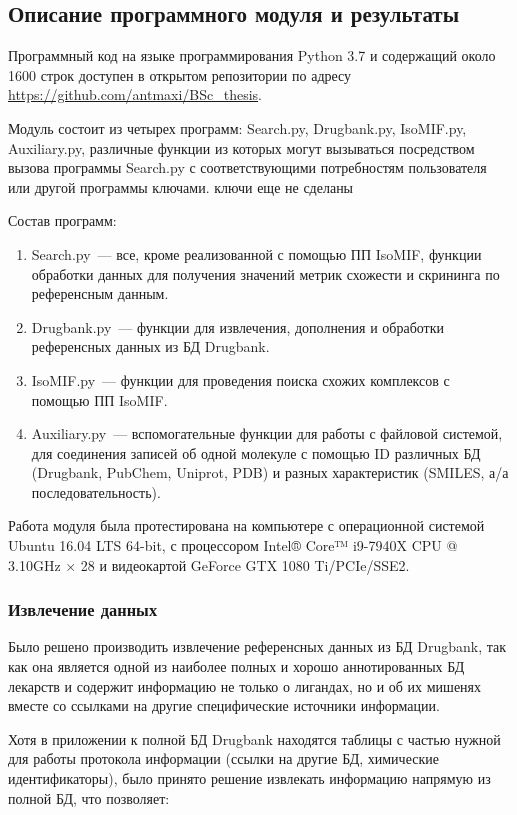 \documentclass[a4paper,14pt]{article}         %
\newcommand{\sic}[1]{\LARGE\color{orange}{#1}\color{black}\Large}
\begin{document}
\subsection{Описание программного модуля и результаты}
Программный код на языке программирования Python 3.7 \cite{python37} и содержащий около 1600 строк \sic{обновлять} доступен в открытом репозитории по адресу \href{https://github.com/antmaxi/BSc\_thesis}{https://github.com/antmaxi/BSc\_thesis}.

Модуль состоит из четырех программ: Search.py, Drugbank.py, IsoMIF.py, Auxiliary.py, различные функции из которых могут вызываться посредством вызова программы Search.py с соответствующими потребностям пользователя или другой программы ключами. \color{orange} ключи еще не сделаны \color{black}

Состав программ:
\begin{enumerate}
	\item Search.py~--- все, кроме реализованной с помощью ПП IsoMIF, функции обработки данных для получения значений метрик схожести и скрининга по референсным данным.
	\item Drugbank.py~--- функции для извлечения, дополнения и обработки референсных данных из БД Drugbank.
	\item IsoMIF.py~--- функции для проведения поиска схожих комплексов с помощью ПП IsoMIF.
	\item Auxiliary.py~--- вспомогательные функции для работы с файловой системой, для соединения записей об одной молекуле с помощью ID различных БД (Drugbank, PubChem, Uniprot, PDB) и разных характеристик (SMILES, а/а последовательность).
\end{enumerate}

Работа модуля была протестирована на компьютере с операционной системой Ubuntu 16.04 LTS 64-bit, с процессором Intel® Core™ i9-7940X CPU @ 3.10GHz $\times$ 28 и видеокартой GeForce GTX 1080 Ti/PCIe/SSE2.
\subsubsection{Извлечение данных}
Было решено производить извлечение референсных данных из БД Drugbank, так как она является одной из наиболее полных и хорошо аннотированных БД лекарств \cite{Wishart2017} и содержит информацию не только о лигандах, но и об их мишенях вместе со ссылками на другие специфические источники информации. 

Хотя в приложении к полной БД Drugbank находятся таблицы с частью нужной для работы протокола информации (ссылки на другие БД, химические идентификаторы), было принято решение извлекать информацию напрямую из полной БД, что позволяет: 
\end{document}
